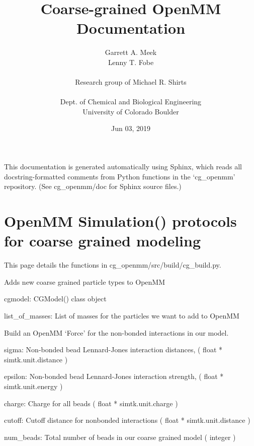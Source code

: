 \documentclass[letterpaper,12pt,english,openany,oneside]{sphinxmanual}
\title{Coarse-grained OpenMM Documentation}
\date{Jun 03, 2019}
\author{Garrett A. Meek\\Lenny T. Fobe\\ \\Research group of Michael R. Shirts\\ \\Dept. of Chemical and Biological Engineering\\University of Colorado Boulder}
\begin{document}
\pagestyle{empty}
\sphinxmaketitle
\pagestyle{plain}
\sphinxtableofcontents
\pagestyle{normal}
\label{\detokenize{index::doc}}


This documentation is generated automatically using Sphinx, which reads all docstring-formatted comments from Python functions in the ‘cg\_openmm’ repository.  (See cg\_openmm/doc for Sphinx source files.)


\chapter{OpenMM Simulation() protocols for coarse grained modeling}
\label{\detokenize{build:openmm-simulation-protocols-for-coarse-grained-modeling}}\label{\detokenize{build::doc}}
This page details the functions in cg\_openmm/src/build/cg\_build.py.

\label{\detokenize{build:module-build.cg_build}}

\begin{fulllineitems}
\label{\detokenize{build:build.cg_build.add_new_elements}}
Adds new coarse grained particle types to OpenMM

cgmodel: CGModel() class object

list\_of\_masses: List of masses for the particles we want to add to OpenMM

\end{fulllineitems}


\begin{fulllineitems}
\label{\detokenize{build:build.cg_build.build_mm_force}}
Build an OpenMM ‘Force’ for the non-bonded interactions in our model.

sigma: Non-bonded bead Lennard-Jones interaction distances,
( float * simtk.unit.distance )

epsilon: Non-bonded bead Lennard-Jones interaction strength,
( float * simtk.unit.energy )

charge: Charge for all beads
( float * simtk.unit.charge )

cutoff: Cutoff distance for nonbonded interactions
( float * simtk.unit.distance )

num\_beads: Total number of beads in our coarse grained model
( integer )

\end{fulllineitems}
\end{document}
